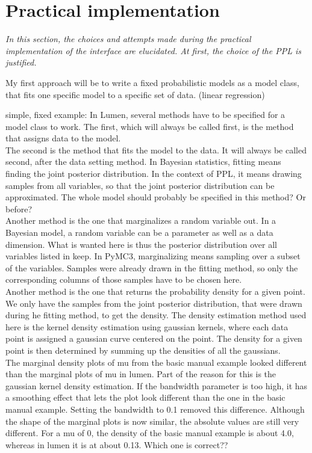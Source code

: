 \documentclass{article}
\begin{document}
\section{Practical implementation}

\textit{In this section, the choices and attempts made during the practical implementation of the interface are elucidated. At first, the choice of the PPL is justified.}

My first approach will be to write a fixed probabilistic models as a model class, that fits one specific model to a specific set of data. (linear regression)


simple, fixed example:
In Lumen, several methods have to be specified for a model class to work. The first, which will always be called first, is the method that assigns data to the model.
\\
The second is the method that fits the model to the data. It will always be called second, after the data setting method. In Bayesian statistics, fitting means finding the joint posterior distribution. In the context of PPL, it means drawing samples from all variables, so that the joint posterior distribution can be approximated. The whole model should probably be specified in this method? Or before?
\\
Another method is the one that marginalizes a random variable out. In a Bayesian model, a random variable can be a parameter as well as a data dimension.  What is wanted here is thus the posterior distribution over all variables listed in keep.
In PyMC3, marginalizing means sampling over a subset of the variables. Samples were already drawn in the fitting method, so only the corresponding columns of those samples have to be chosen here.
\\
Another method is the one that returns the probability density for a given point.
We only have the samples from the joint posterior distribution, that were drawn during he fitting method, to get the density. The density estimation method used here is the kernel density estimation using gaussian kernels, where each data point is assigned a gaussian curve centered on the point. The density for a given point is then determined by summing up the densities of all the gaussians.
\\
The marginal density plots of mu from the basic manual example looked different than the marginal plots of mu in lumen. Part of the reason for this is the gaussian kernel density estimation. If the bandwidth parameter is too high, it has a smoothing effect that lets the plot look different than the one in the basic manual example. Setting the bandwidth to 0.1 removed this difference. Although the shape of the marginal plots is now similar, the absolute values are still very different. For a mu of 0, the density of the basic manual example is about 4.0, whereas in lumen it is at about 0.13. Which one is correct??
\end{document}
